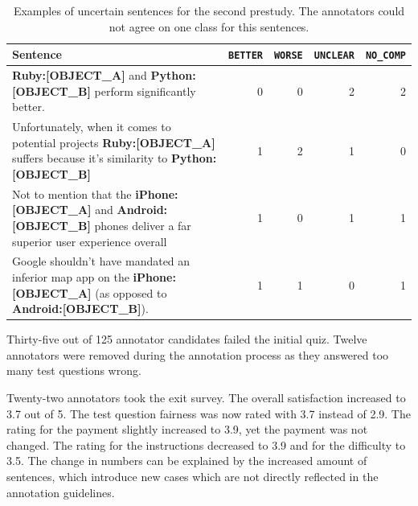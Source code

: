 \begin{table}[tp]
\centering
\caption{Examples of uncertain sentences for the second prestudy. The annotators could not agree on one class for this sentences. }
\label{tbl:pre_2_res}
\begin{tabularx}{\textwidth}{Xrrrr}
\toprule
 Sentence        & \texttt{BETTER} & \texttt{WORSE} & \texttt{UNCLEAR} & \texttt{NO\_COMP}          \\ \midrule
\textbf{{\color[HTML]{9A14B2}Ruby:{[}OBJECT\_A{]}}} and \textbf{{\color[HTML]{6CB219} Python:{[}OBJECT\_B{]}}} perform significantly better. & 0 & 0 & 2 & 2 \\

Unfortunately, when it comes to potential projects \textbf{{\color[HTML]{9A14B2}Ruby:{[}OBJECT\_A{]}}} suffers because it's similarity to \textbf{{\color[HTML]{6CB219} Python:{[}OBJECT\_B{]}}} & 1 & 2 & 1 & 0 \\


Not to mention that the \textbf{{\color[HTML]{9A14B2}iPhone:{[}OBJECT\_A{]}}} and \textbf{{\color[HTML]{6CB219} Android:{[}OBJECT\_B{]}}} phones deliver a far superior user experience overall & 1 & 0 & 1 & 1 \\

Google shouldn't have mandated an inferior map app on the \textbf{{\color[HTML]{9A14B2}iPhone:{[}OBJECT\_A{]}}} (as opposed to \textbf{{\color[HTML]{6CB219} Android:{[}OBJECT\_B{]}}}). & 1 & 1 & 0 & 1 \\



\bottomrule                              
\end{tabularx}
\end{table}

 \FloatBarrier
Thirty-five out of 125 annotator candidates failed the initial quiz. Twelve annotators were removed during the annotation process as they answered too many test questions wrong.

Twenty-two annotators took the exit survey. The overall satisfaction increased to 3.7 out of 5. The test question fairness was now rated with 3.7  instead of 2.9. The rating for the payment slightly increased to 3.9, yet the payment was not changed. The rating for the instructions decreased to 3.9 and for the difficulty to 3.5.
The change in numbers can be explained by the increased amount of sentences, which introduce new cases which are not directly reflected in the annotation guidelines.

